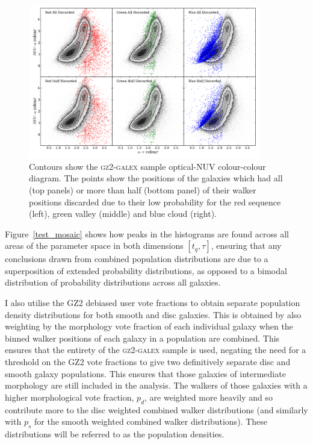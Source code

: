 \begin{figure}
\includegraphics[width=0.9\textwidth]{starpy/discarded_galaxy_colour_colour.pdf}
\caption[Colours of discarded galaxies]{Contours show the \textsc{gz2-galex} sample optical-NUV colour-colour diagram. The points show the positions of the galaxies which had all (top panels) or more than half (bottom panel) of their walker positions discarded due to their low probability for the red sequence (left), green valley (middle) and blue cloud (right).}
\label{discarded}
\end{figure}

Figure~\ref{test_mosaic} shows how peaks in the histograms are found across all areas of the parameter space in both dimensions $[t_q, \tau]$, ensuring that any conclusions drawn from combined population distributions are due to a superposition of extended probability distributions, as opposed to a bimodal distribution of probability distributions across all galaxies.

I also utilise the GZ2 debiased user vote fractions to obtain separate population density distributions for both smooth and disc galaxies. This is obtained by also weighting by the morphology vote fraction of each individual galaxy when the binned walker positions of each galaxy in a population are combined. This ensures that the entirety of the \textsc{gz2-galex} sample is used, negating the need for a threshold on the GZ2 vote fractions \citep[e.g., $p_d > 0.8$ as used in][]{schawinski14} to give two definitively separate disc and smooth galaxy populations. This ensures that those galaxies of intermediate morphology are still included in the analysis. The walkers of those galaxies with a higher morphological vote fraction, $p_d$, are weighted more heavily and so contribute more to the disc weighted combined walker distributions (and similarly with $p_s$ for the smooth weighted combined walker distributions). These distributions will be referred to as the population densities.

